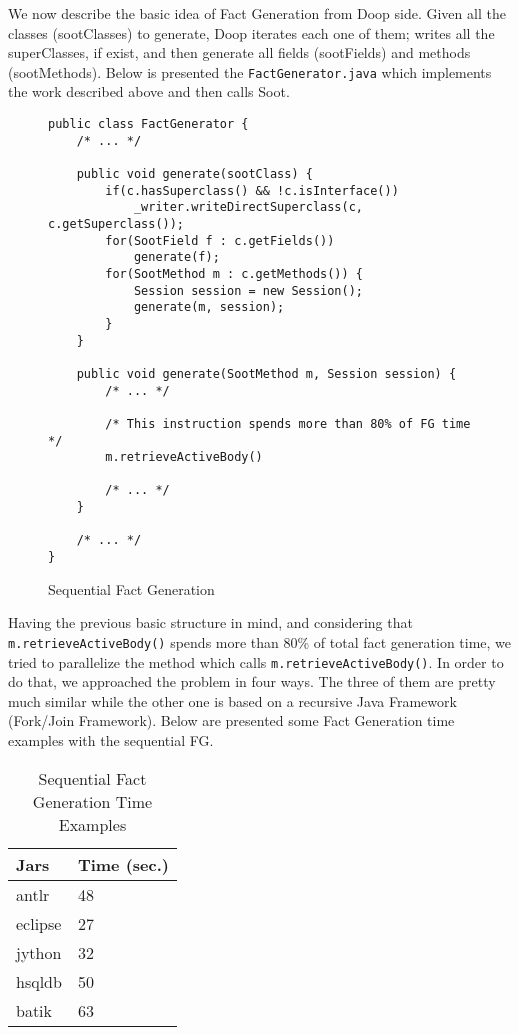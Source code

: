 \documentclass{dithesis}
\begin{document}
    We now describe the basic idea of Fact Generation from Doop side. Given all the classes (sootClasses) to generate, Doop iterates each one of them; writes all the superClasses, if exist, and then generate all fields (sootFields) and methods (sootMethods). Below is presented the \texttt{FactGenerator.java} which implements the work described above and then calls Soot.
    \begin{figure}[H]
\begin{lstlisting}
public class FactGenerator {
    /* ... */

    public void generate(sootClass) {
        if(c.hasSuperclass() && !c.isInterface())
            _writer.writeDirectSuperclass(c, c.getSuperclass());
        for(SootField f : c.getFields())
            generate(f);
        for(SootMethod m : c.getMethods()) {
            Session session = new Session();
            generate(m, session);
        }
    }

    public void generate(SootMethod m, Session session) {
        /* ... */

        /* This instruction spends more than 80% of FG time */
        m.retrieveActiveBody()

        /* ... */
    }

    /* ... */
}
\end{lstlisting}
    \caption{Sequential Fact Generation}
    \end{figure}

    Having the previous basic structure in mind, and considering that \texttt{m.retrieveActiveBody()} spends more than 80\% of total fact generation time, we tried to parallelize the method which calls \texttt{m.retrieveActiveBody()}. In order to do that, we approached the problem in four ways. The three of them are pretty much similar while the other one is based on a recursive Java Framework (Fork/Join Framework). Below are presented some Fact Generation time examples with the sequential FG.
    \begin{table}[H]
		\centering
        \begin{tabular}{@{}ll@{}}
        \toprule
        \textbf{Jars} & \textbf{Time (sec.)} \\ \midrule
        antlr          & 48                    \\
        eclipse        & 27                    \\
        jython         & 32                    \\
        hsqldb         & 50                    \\
        batik          & 63                    \\ \bottomrule
        \end{tabular}
        \newline
		\caption{Sequential Fact Generation Time Examples}
	\end{table}
\end{document}
